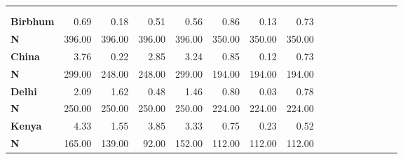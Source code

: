 \begin{tabular}{@{\extracolsep{5pt}}lrrrrrrrrrrrrrrr}
\toprule
&  &  &  &  &  &  &  \\
{\bf } &  &  &  &  &  &  &  \\
\hline
{\bf Birbhum} & 0.69\phantom{***} & 0.18\phantom{***} & 0.51\phantom{***} & 0.56\phantom{***} & 0.86\phantom{***} & 0.13\phantom{***} & 0.73\phantom{***} \\
{\bf N} & 396.00\phantom{***} & 396.00\phantom{***} & 396.00\phantom{***} & 396.00\phantom{***} & 350.00\phantom{***} & 350.00\phantom{***} & 350.00\phantom{***} \\
{\bf China} & 3.76\phantom{***} & 0.22\phantom{***} & 2.85\phantom{***} & 3.24\phantom{***} & 0.85\phantom{***} & 0.12\phantom{***} & 0.73\phantom{***} \\
{\bf N} & 299.00\phantom{***} & 248.00\phantom{***} & 248.00\phantom{***} & 299.00\phantom{***} & 194.00\phantom{***} & 194.00\phantom{***} & 194.00\phantom{***} \\
{\bf Delhi} & 2.09\phantom{***} & 1.62\phantom{***} & 0.48\phantom{***} & 1.46\phantom{***} & 0.80\phantom{***} & 0.03\phantom{***} & 0.78\phantom{***} \\
{\bf N} & 250.00\phantom{***} & 250.00\phantom{***} & 250.00\phantom{***} & 250.00\phantom{***} & 224.00\phantom{***} & 224.00\phantom{***} & 224.00\phantom{***} \\
{\bf Kenya} & 4.33\phantom{***} & 1.55\phantom{***} & 3.85\phantom{***} & 3.33\phantom{***} & 0.75\phantom{***} & 0.23\phantom{***} & 0.52\phantom{***} \\
{\bf N} & 165.00\phantom{***} & 139.00\phantom{***} & 92.00\phantom{***} & 152.00\phantom{***} & 112.00\phantom{***} & 112.00\phantom{***} & 112.00\phantom{***} \\

\end{tabular}
